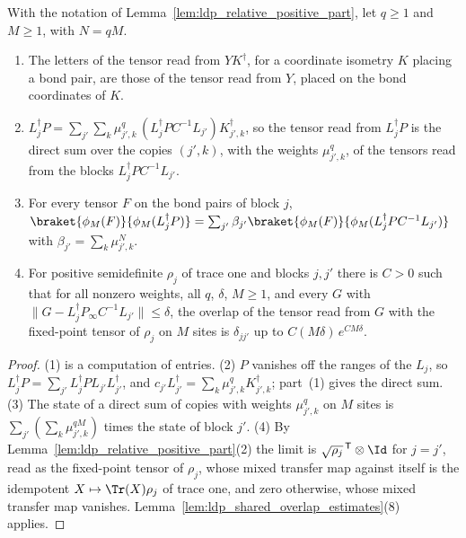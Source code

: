 \begin{lemma}
    \label{lem:ldp_relative_overlaps}
    \leanok
    With the notation of Lemma~\ref{lem:ldp_relative_positive_part}, let $q\geq1$ and
    $M\geq1$, with $N=qM$.
    \begin{enumerate}
        \item The letters of the tensor read from $YK^\dagger$, for a coordinate isometry $K$
              placing a bond pair, are those of the tensor read from $Y$, placed on the bond
              coordinates of $K$.
        \item $L_j^\dagger P=\sum_{j'}\sum_k\mu_{j',k}^q\,(L_j^\dagger PC^{-1}L_{j'})
                  K_{j',k}^\dagger$, so the tensor read from $L_j^\dagger P$ is the direct
              sum over the copies $(j',k)$, with the weights $\mu_{j',k}^q$, of the tensors
              read from the blocks $L_j^\dagger PC^{-1}L_{j'}$.
        \item For every tensor $F$ on the bond pairs of block $j$,
              $\braket{\phi_M(F)}{\phi_M(L_j^\dagger P)}
                  =\sum_{j'}\beta_{j'}\braket{\phi_M(F)}{\phi_M(L_j^\dagger PC^{-1}L_{j'})}$
              with $\beta_{j'}=\sum_k\mu_{j',k}^N$.
        \item For positive semidefinite $\rho_j$ of trace one and blocks $j,j'$ there is
              $C>0$ such that for all nonzero weights, all $q$, $\delta$, $M\geq1$, and every
              $G$ with $\lVert G-L_j^\dagger P_\infty C^{-1}L_{j'}\rVert\leq\delta$, the
              overlap of the tensor read from $G$ with the fixed-point tensor of $\rho_j$ on
              $M$ sites is $\delta_{jj'}$ up to $C(M\delta)\,e^{CM\delta}$.
    \end{enumerate}
\end{lemma}
\begin{proof}
    \leanok
    (1) is a computation of entries. (2) $P$ vanishes off the ranges of the $L_j$, so
    $L_j^\dagger P=\sum_{j'}L_j^\dagger PL_{j'}L_{j'}^\dagger$, and
    $c_{j'}L_{j'}^\dagger=\sum_k\mu_{j',k}^qK_{j',k}^\dagger$; part~(1) gives the direct sum.
    (3) The state of a direct sum of copies with weights $\mu_{j',k}^q$ on $M$ sites is
    $\sum_{j'}(\sum_k\mu_{j',k}^{qM})$ times the state of block $j'$. (4) By
    Lemma~\ref{lem:ldp_relative_positive_part}(2) the limit is
    $\sqrt{\rho_j}^{\,\mathsf T}\otimes\Id$ for $j=j'$, read as the fixed-point tensor of
    $\rho_j$, whose mixed transfer map against itself is the idempotent
    $X\mapsto\Tr(X)\rho_j$ of trace one, and zero otherwise, whose mixed transfer map
    vanishes. Lemma~\ref{lem:ldp_shared_overlap_estimates}(8) applies.
\end{proof}

